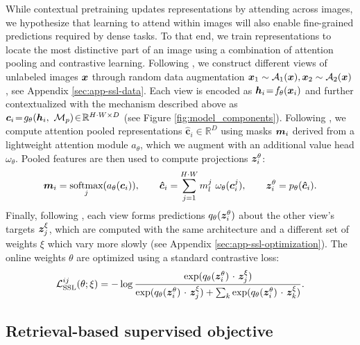 \documentclass{article}
\begin{document}
\noindent While contextual pretraining updates representations by attending across images, we hypothesize that learning to attend within images will also enable fine-grained predictions required by dense tasks. To that end, we train representations to locate the most distinctive part of an image using a combination of attention pooling and contrastive learning. Following \cite{chen2020simple,grill2020bootstrap}, we construct different views of unlabeled images ${\bm{x}}$ through random data augmentation ${\bm{x}}_1 \sim \mathcal{A}_1({\bm{x}}), {\bm{x}}_2 \sim \mathcal{A}_2({\bm{x}})$, see Appendix \ref{sec:app-ssl-data}.
Each view is encoded as ${\bm{h}}_i \!=\! f_\theta({\bm{x}}_i)$ and further contextualized with the mechanism described above as $\bm{c}_i \!=\! g_\theta( {\bm{h}}_i, \ \mathcal{M}_p ) \!\in\! \mathbb{R}^{H \cdot W \times D}$ (see Figure \ref{fig:model_components}). Following \cite{parthasarathy2022self}, we compute attention pooled representations $\bm{\hat{c}}_i \!\in\! \mathbb{R}^D$ using masks ${\bm{m}}_i$ derived from a lightweight attention module $a_\theta$, which we augment with an additional value head $\omega_\theta$. Pooled features are then used to compute projections ${\bm{z}}^\theta_{i}$:
\begin{equation}
\vm_{i} = \underset{j}{\textrm{softmax}}(a_\theta(\vc_{i})), \qquad 
\bm{\hat{c}}_i = \sum_{j=1}^{H \cdot W} m^j_l \ \omega_\theta(\bm{c}_i^j), \qquad 
\vz^\theta_{i} = p_\theta ( \bm{\hat{c}}_i ).
\label{eq:attn-pool}
\end{equation}
Finally, following \cite{grill2020bootstrap, chen2021empirical, tian2021divide}, each view forms predictions $q_\theta( {\bm{z}}^\theta_{i})$ about the other view's targets ${\bm{z}}^\xi_{j}$, which are computed with the same architecture and a different set of weights $\xi$ which vary more slowly (see Appendix \ref{sec:app-ssl-optimization}). The online weights $\theta$ are optimized using a standard contrastive loss: 
\begin{equation}
\mathcal{L}_\textrm{SSL}^{ij}(\theta; \xi) = - \log \frac{\exp( q_\theta( {\bm{z}}^\theta_{i}) \ {\cdot} \ {\bm{z}}^\xi_{j}) }{\exp( q_\theta( {\bm{z}}^\theta_{i}) \ {\cdot} \ {\bm{z}}^\xi_{j} ) + \sum_k \exp( q_\theta( {\bm{z}}^\theta_{i}) \ {\cdot} \ {\bm{z}}^\xi_{k} )}.
\label{eq:ssl-loss}
\end{equation}



\vspace{-1em}
\subsection{Retrieval-based supervised objective} \label{sec:sup}
\end{document}
